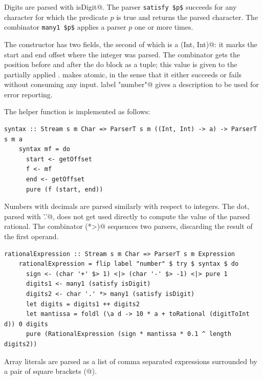 \documentclass[UdineBachThesis,american,11pt]{PhdThesis}
\begin{document}
  Digits are parsed with \lstinline@satisfy isDigit@. The parser
  \lstinline[mathescape]@satisfy $p$@ succeeds for any character for which the
  predicate $p$ is true and returns the parsed character. The combinator
  \lstinline[mathescape]@many1 $p$@ applies a parser $p$ one or more times.

  The constructor \lstinline@IntegerExpression@ has two fields, the second of
  which is a \lstinline@(Int, Int)@: it marks the start and end offset where the
  integer was parsed. The \lstinline@syntax@ combinator gets the position before
  and after the do block as a tuple; this value is given to the partially
  applied \lstinline@IntegerExpression@. \lstinline@try@ makes
  \lstinline@integerExpression@ atomic, in the sense that it either succeeds or
  fails without consuming any input. \lstinline@flip label "number"@ gives a
  description to be used for error reporting.

  The helper function \lstinline@syntax@ is implemented as follows:

  \begin{lstlisting}[gobble=4,basicstyle=\ttfamily\small]
    syntax :: Stream s m Char => ParserT s m ((Int, Int) -> a) -> ParserT s m a
    syntax mf = do
      start <- getOffset
      f <- mf
      end <- getOffset
      pure (f (start, end))
  \end{lstlisting}

  Numbers with decimals are parsed similarly with respect to integers. The dot,
  parsed with \lstinline@char '.'@, does not get used directly to compute the
  value of the parsed rational. The combinator \lstinline@(*>)@ sequences two
  parsers, discarding the result of the first operand.

  \begin{lstlisting}[gobble=4,basicstyle=\ttfamily\small]
    rationalExpression :: Stream s m Char => ParserT s m Expression
    rationalExpression = flip label "number" $ try $ syntax $ do
      sign <- (char '+' $> 1) <|> (char '-' $> -1) <|> pure 1
      digits1 <- many1 (satisfy isDigit)
      digits2 <- char '.' *> many1 (satisfy isDigit)
      let digits = digits1 ++ digits2
      let mantissa = foldl (\a d -> 10 * a + toRational (digitToInt d)) 0 digits
      pure (RationalExpression (sign * mantissa * 0.1 ^ length digits2))
  \end{lstlisting}

  Array literals are parsed as a list of comma separated expressions surrounded
  by a pair of square brackets (\lstinline@[@, \lstinline@]@).
\end{document}
